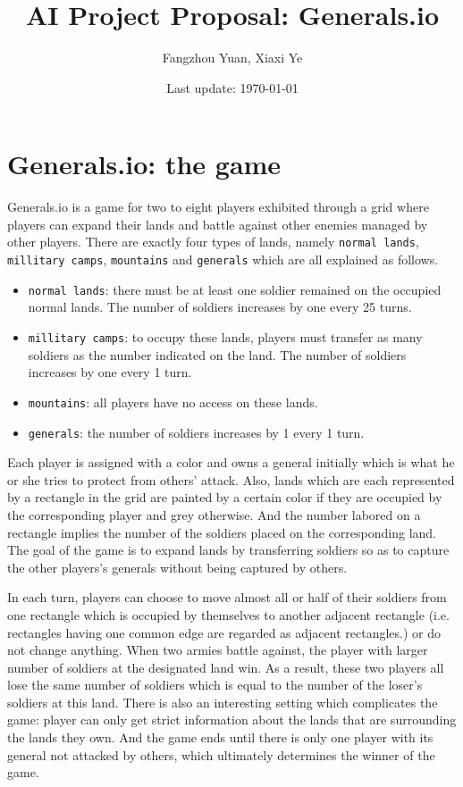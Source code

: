 \documentclass{elegantpaper}
\title{AI Project Proposal: Generals.io}
\author{Fangzhou Yuan, Xiaxi Ye}
\date{Last update: \today}
\begin{document}
\maketitle

\section{Generals.io: the game}
Generals.io is a game for two to eight players exhibited through a grid where players can expand their lands and battle against other enemies managed by other players.
There are exactly four types of lands, namely \verb|normal lands|, \verb|millitary camps|, \verb|mountains| and \verb|generals| which are all explained as follows.
\begin{itemize}[noitemsep]
	\item \verb|normal lands|: there must be at least one soldier remained on the occupied normal lands. The number of soldiers increases by one every 25 turns.
	\item \verb|millitary camps|: to occupy these lands, players must transfer as many soldiers as the number indicated on the land. The number of soldiers increases by one every 1 turn.
	\item \verb|mountains|: all players have no access on these lands.
	\item \verb|generals|: the number of soldiers increases by 1 every 1 turn.
\end{itemize}
\begin{figure}[H]
	\caption{\label{1} }
\end{figure}

Each player is assigned with a color and owns a general initially which is what he or she tries to protect from others' attack. Also, lands which are each represented by a rectangle in the grid are painted by a certain color if they are  occupied by the corresponding player and grey otherwise. And the number labored on a rectangle implies the number of the soldiers placed on the corresponding land.
The goal of the game is to expand lands by transferring soldiers so as to capture the other players's generals without being captured by others.

In each turn, players can choose to move almost all or half of their soldiers from one rectangle which is occupied by themselves to another adjacent rectangle (i.e. rectangles having one common edge are regarded as adjacent rectangles.) or do not change anything. When two armies battle against, the player with larger number of soldiers at the designated land win. As a result, these two players all lose the same number of soldiers which is equal to the number of the loser's soldiers at this land. There is also an interesting setting which complicates the game: player can only get strict information about the lands that are surrounding the lands they own. And the game ends until there is only one player with its general not attacked by others, which ultimately determines the winner of the game.
\end{document}
